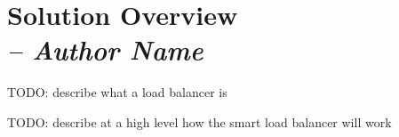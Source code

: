 \chapter{Solution Overview \\
  \small{\textit{-- Author Name}}
  \label{Chapter::SolutionOverview}}


TODO: describe what a load balancer is

TODO: describe at a high level how the smart load balancer will work
